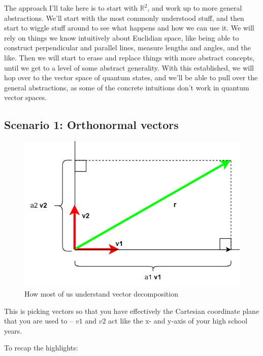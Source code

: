 \documentclass[
]{book}
\begin{document}
The approach I'll take here is to start with \(\mathbb{R}^2\), and work up to more general abstractions. We'll start with the most commonly understood stuff, and then start to wiggle stuff around to see what happens and how we can use it. We will rely on things we know intuitively about Euclidian space, like being able to construct perpendicular and parallel lines, measure lengths and angles, and the like. Then we will start to erase and replace things with more abstract concepts, until we get to a level of some abstract generality. With this established, we will hop over to the vector space of quantum states, and we'll be able to pull over the general abstractions, as some of the concrete intuitions don't work in quantum vector spaces.

\hypertarget{scenario-1-orthonormal-vectors}{%
\subsection{Scenario 1: Orthonormal vectors}\label{scenario-1-orthonormal-vectors}}

\begin{figure}

{\centering \includegraphics[width=0.75\linewidth,height=0.75\textheight]{images/orthonormal-decomposition} 

}

\caption{How most of us understand vector decomposition}\label{fig:unnamed-chunk-4}
\end{figure}

This is picking vectors so that you have effectively the Cartesian coordinate plane that you are used to -- \(v1\) and \(v2\) act like the x- and y-axis of your high school years.

To recap the highlights:
\end{document}
